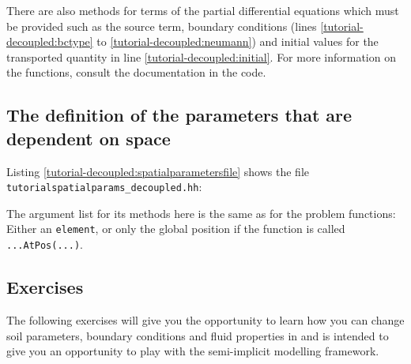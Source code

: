 There are also methods for terms of the partial differential equations which must be provided such as the source term, boundary conditions (lines \ref{tutorial-decoupled:bctype} to
\ref{tutorial-decoupled:neumann}) and initial values for the transported
quantity in line \ref{tutorial-decoupled:initial}. For more information
on the functions, consult the documentation in the code.

\subsection{The definition of the parameters that are dependent on space}\label{tutorial-decoupled:description-spatialParameters}

Listing \ref{tutorial-decoupled:spatialparametersfile} shows the file
\verb+tutorialspatialparams_decoupled.hh+:

\begin{lst}\label{tutorial-decoupled:spatialparametersfile} \mbox{}

\end{lst}
The argument list for its methods here is the same as for the problem 
functions: Either an \texttt{element}, or only the global position if the function is called \texttt{...AtPos(...)}.

\subsection{Exercises}
\label{tutorial-deoucpled:exercises}
The following exercises will give you the opportunity to learn how you
can change soil parameters, boundary conditions and fluid properties
in \eWoms and is intended to give you an opportunity to play with the
semi-implicit modelling framework.

